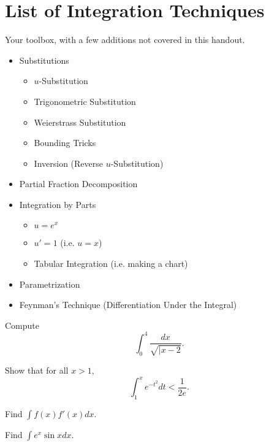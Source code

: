 \documentclass{article}
\begin{document}
\section{List of Integration Techniques}
Your toolbox, with a few additions not covered in this handout.
\begin{itemize}
    \item Substitutions
    \begin{itemize}
        \item $u$-Substitution
        \item Trigonometric Substitution
        \item Weierstrass Substitution
        \item Bounding Tricks
        \item Inversion (Reverse $u$-Substitution)
    \end{itemize}
    \item Partial Fraction Decomposition
    \item Integration by Parts
    \begin{itemize}
        \item $u=e^x$
        \item $u'=1$ (i.e. $u=x$)
        \item Tabular Integration (i.e. making a chart)
    \end{itemize}
    \item Parametrization
    \item Feynman's Technique (Differentiation Under the Integral)
\end{itemize}

\problems



\begin{prob}[SMT 2018/4]{2}
Compute
\[\int_0^4\frac{dx}{\sqrt{|x-2}}.\]
\end{prob}

\begin{prob}{2}
Show that for all $x>1,$
\[\int_{1}^x e^{-t^2}dt<\frac{1}{2e}.\]
\end{prob}

\begin{req}[]{2}
Find $\int f(x)f'(x)dx.$
\end{req}

\begin{req}[]{3}
Find $\int e^x\sin xdx.$
\end{req}
\end{document}
